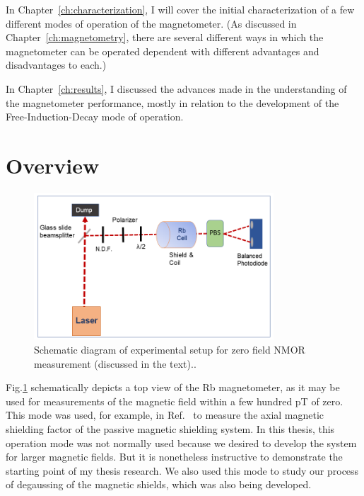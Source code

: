 In Chapter~\ref{ch:characterization}, I will cover the initial
characterization of a few different modes of operation of the
magnetometer.  (As discussed in Chapter~\ref{ch:magnetometry}, there
are several different ways in which the magnetometer can be operated
dependent with different advantages and disadvantages to each.)

In Chapter~\ref{ch:results}, I discussed the advances made in the
understanding of the magnetometer performance, mostly in relation to
the development of the Free-Induction-Decay mode of operation.


\section{Overview}

\begin{figure}%
\centering
\includegraphics[width=0.8\textwidth]{figures/experimental_setup_zero_field}
\caption{Schematic diagram of experimental setup for zero field NMOR measurement (discussed in the text).\label{fig:zerofield}.}
\end{figure}

Fig.\ref{fig:zerofield} schematically depicts a top view of the Rb
magnetometer, as it may be used for measurements of the magnetic field
within a few hundred pT of zero.  This mode was used, for example, in
Ref.~\cite{bib:nmor} to measure the axial magnetic shielding factor of
the passive magnetic shielding system.  In this thesis, this operation
mode was not normally used because we desired to develop the system
for larger magnetic fields.  But it is nonetheless instructive to
demonstrate the starting point of my thesis research.  We also used
this mode to study our process of degaussing of the magnetic shields,
which was also being developed.

